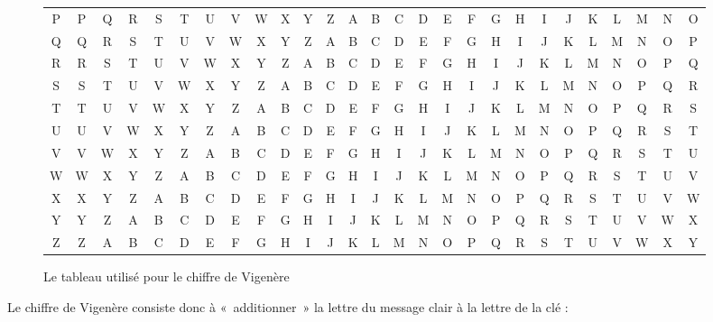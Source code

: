 \begin{figure}[h]
\begin{center}
\begin{tabular}{c|c@{}c@{}c@{}c@{}c@{}c@{}c@{}c@{}c@{}c@{}c@{}c@{}c@{}c@{}c@{}c@{}c@{}c@{}c@{}c@{}c@{}c@{}c@{}c@{}c@{}c}
      P & P & Q & R & S & T & U & V & W & X & Y & Z & A & B & C & D & E & F & G & H & I & J & K & L & M & N & O \\
      Q & Q & R & S & T & U & V & W & X & Y & Z & A & B & C & D & E & F & G & H & I & J & K & L & M & N & O & P \\
      R & R & S & T & U & V & W & X & Y & Z & A & B & C & D & E & F & G & H & I & J & K & L & M & N & O & P & Q \\
      S & S & T & U & V & W & X & Y & Z & A & B & C & D & E & F & G & H & I & J & K & L & M & N & O & P & Q & R \\
      T & T & U & V & W & X & Y & Z & A & B & C & D & E & F & G & H & I & J & K & L & M & N & O & P & Q & R & S \\
      U & U & V & W & X & Y & Z & A & B & C & D & E & F & G & H & I & J & K & L & M & N & O & P & Q & R & S & T \\
      V & V & W & X & Y & Z & A & B & C & D & E & F & G & H & I & J & K & L & M & N & O & P & Q & R & S & T & U \\
      W & W & X & Y & Z & A & B & C & D & E & F & G & H & I & J & K & L & M & N & O & P & Q & R & S & T & U & V \\
      X & X & Y & Z & A & B & C & D & E & F & G & H & I & J & K & L & M & N & O & P & Q & R & S & T & U & V & W \\
      Y & Y & Z & A & B & C & D & E & F & G & H & I & J & K & L & M & N & O & P & Q & R & S & T & U & V & W & X \\
      Z & Z & A & B & C & D & E & F & G & H & I & J & K & L & M & N & O & P & Q & R & S & T & U & V & W & X & Y \\
    \end{tabular}
  \end{center}
  \caption{Le tableau utilisé pour le chiffre de Vigenère}
  \label{fig:VigenereTableau}
\end{figure}

Le chiffre de Vigenère consiste donc à «~additionner~» la lettre du
message clair à la lettre de la clé : 


